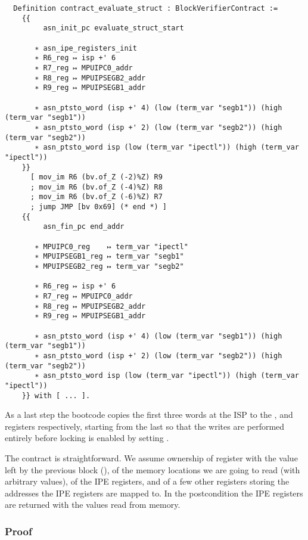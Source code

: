 \begin{verbatim}
  Definition contract_evaluate_struct : BlockVerifierContract :=
    {{
         asn_init_pc evaluate_struct_start

       ∗ asn_ipe_registers_init
       ∗ R6_reg ↦ isp +' 6
       ∗ R7_reg ↦ MPUIPC0_addr
       ∗ R8_reg ↦ MPUIPSEGB2_addr
       ∗ R9_reg ↦ MPUIPSEGB1_addr

       ∗ asn_ptsto_word (isp +' 4) (low (term_var "segb1")) (high (term_var "segb1"))
       ∗ asn_ptsto_word (isp +' 2) (low (term_var "segb2")) (high (term_var "segb2"))
       ∗ asn_ptsto_word isp (low (term_var "ipectl")) (high (term_var "ipectl"))
    }}
      [ mov_im R6 (bv.of_Z (-2)%Z) R9
      ; mov_im R6 (bv.of_Z (-4)%Z) R8
      ; mov_im R6 (bv.of_Z (-6)%Z) R7
      ; jump JMP [bv 0x69] (* end *) ]
    {{
         asn_fin_pc end_addr

       ∗ MPUIPC0_reg    ↦ term_var "ipectl"
       ∗ MPUIPSEGB1_reg ↦ term_var "segb1"
       ∗ MPUIPSEGB2_reg ↦ term_var "segb2"

       ∗ R6_reg ↦ isp +' 6
       ∗ R7_reg ↦ MPUIPC0_addr
       ∗ R8_reg ↦ MPUIPSEGB2_addr
       ∗ R9_reg ↦ MPUIPSEGB1_addr

       ∗ asn_ptsto_word (isp +' 4) (low (term_var "segb1")) (high (term_var "segb1"))
       ∗ asn_ptsto_word (isp +' 2) (low (term_var "segb2")) (high (term_var "segb2"))
       ∗ asn_ptsto_word isp (low (term_var "ipectl")) (high (term_var "ipectl"))
    }} with [ ... ].
\end{verbatim}

As a last step the bootcode copies the first three words at the ISP to the ,  and  registers respectively, starting from the last so that the writes are performed entirely before locking is enabled by setting .

The contract is straightforward. We assume ownership of register  with the value left by the previous block (), of the memory locations we are going to read (with arbitrary values), of the IPE registers, and of a few other registers storing the addresses the IPE registers are mapped to. In the postcondition the IPE registers are returned with the values read from memory.

\subsubsection{Proof}
\label{sec:valid_evaluate_struct}

